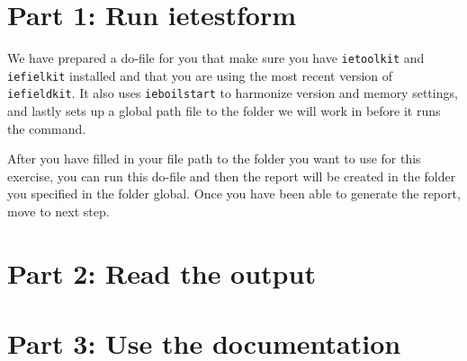\documentclass{tufte-handout}
\begin{document}
\section{Part 1: Run ietestform}

	We have prepared a do-file for you that make sure you have \verb|ietoolkit| and \verb|iefielkit| installed and that you are using the most recent version of \verb|iefieldkit|. It also uses \verb|ieboilstart| to harmonize version and memory settings, and lastly sets up a global path file to the folder we will work in before it runs the command.
	
	After you have filled in your file path to the folder you want to use for this exercise, you can run this do-file and then the report will be created in the folder you specified in the folder global. Once you have been able to generate the report, move to next step.


	\begin{minipage}{1.5\textwidth}
	\vspace{.5cm}
	 	{	
 		}
 	\end{minipage}


\section{Part 2: Read the output}



\section{Part 3: Use the documentation}
\end{document}
